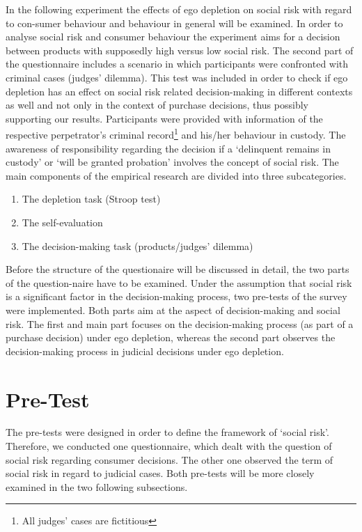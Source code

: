 \onehalfspacing
In the following experiment the effects of ego depletion on social risk with regard to con-sumer behaviour and behaviour in general will be examined. In order to analyse social risk and consumer behaviour the experiment aims for a decision between products with supposedly high versus low social risk. The second part of the questionnaire includes a scenario in which participants were confronted with criminal cases (judges’ dilemma). This test was included in order to check if ego depletion has an effect on social risk related decision-making in different contexts as well and not only in the context of purchase decisions, thus possibly supporting our results. Participants were provided with information of the respective perpetrator’s criminal record\footnote{All judges’ cases are fictitious} and his/her behaviour in custody. The awareness of responsibility regarding the decision if a ‘delinquent remains in custody’ or ‘will be granted probation’ involves the concept of social risk.
The main components of the empirical research are divided into three subcategories. 
\begin{enumerate}
\item The depletion task (Stroop test)
\item The self-evaluation 
\item The decision-making task (products/judges’ dilemma)
\end{enumerate}
Before the structure of the questionaire will be discussed in detail, the two parts of the question-naire have to be examined. Under the assumption that social risk is a significant factor in the decision-making process, two pre-tests of the survey were implemented. Both parts aim at the aspect of decision-making and social risk. The first and main part focuses on the decision-making process (as part of a purchase decision) under ego depletion, whereas the second part observes the decision-making process in judicial decisions under ego depletion. 
\section{Pre-Test}
The pre-tests were designed in order to define the framework of ‘social risk’. Therefore, we conducted one questionnaire, which dealt with the question of social risk regarding consumer decisions. The other one observed the term of social risk in regard to judicial cases. Both pre-tests will be more closely examined in the two following subsections.
